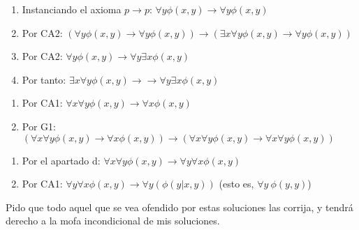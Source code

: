 \begin{problem}
\begin{enumerate}
\end{enumerate}

\spart

\begin{enumerate}
	\item Instanciando el axioma $p \to p$:  $\forall y \phi (x,y)  \to \forall y \phi (x,y)$
	\item Por CA2: $(\forall y \phi (x,y)  \to \forall y \phi (x,y))\to (\exists x \forall y \phi (x,y)  \to  \forall y \phi(x,y))$
	\item Por CA2:  $ \forall y \phi(x,y) \to \forall y \exists x \phi(x,y) $
	\item Por tanto:  $ \exists x \forall y \phi (x,y) \to\to \forall y \exists x \phi (x,y) $
\end{enumerate}

\spart

\begin{enumerate}
	\item Por CA1: $ \forall x \forall y \phi (x,y) \to \forall x \phi (x,y)$
	\item Por G1: $ (\forall x \forall y \phi (x,y) \to \forall x \phi (x,y)) \to (\forall x \forall y \phi (x,y) \to \forall x \forall y \phi (x,y))$
\end{enumerate}

\spart


\begin{enumerate}
	\item Por el apartado d: $ \forall x \forall y \phi (x,y) \to \forall y \forall x \phi (x,y)$
	\item Por CA1: $\forall y \forall x \phi (x,y) \to \forall y (\phi (y|x, y))$ (esto es, $\forall y~\phi (y,y)$)
\end{enumerate}

{\color{orange} Pido que todo aquel que se vea ofendido por estas soluciones las corrija, y tendrá derecho a la mofa incondicional de mis soluciones.}

\end{problem}